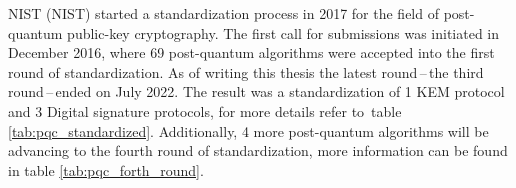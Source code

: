 NIST (\acl{NIST}) started a standardization process in 2017 for the field of post-quantum public-key cryptography. The first call for submissions was initiated in December 2016, where 69 post-quantum algorithms were accepted into the first round of standardization. As of writing this thesis the latest round\,--\,the third round\,--\,ended on July 2022. The result was a standardization of 1 KEM protocol and 3 Digital signature protocols, for more details refer to~table \ref{tab:pqc_standardized}. Additionally, 4 more post-quantum algorithms will be advancing to the fourth round of standardization, more information can be found in table \ref{tab:pqc_forth_round}. \cite{Alagic2022}

